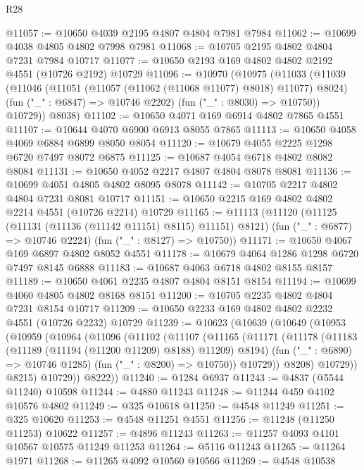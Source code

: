 \begin{lexlean}{R28}
\begin{coremodule}
@11057 := @10650 @4039 @2195 @4807 @4804 @7981 @7984
@11062 := @10699 @4038 @4805 @4802 @7998 @7981
@11068 := @10705 @2195 @4802 @4804 @7231 @7984 @10717
@11077 := @10650 @2193 @169 @4802 @4802 @2192 @4551 (@10726 @2192) @10729
@11096 := @10970
    (@10975
      (@11033
        (@11039
          (@11046
            (@11051 (@11057 (@11062 (@11068 @11077) @8018) @11077) @8024)
            (fun ("_" : @6847) => @10746 @2202)
            (fun ("_" : @8030) => @10750))
          @10729))
      @8038)
@11102 := @10650 @4071 @169 @6914 @4802 @7865 @4551
@11107 := @10644 @4070 @6900 @6913 @8055 @7865
@11113 := @10650 @4058 @4069 @6884 @6899 @8050 @8054
@11120 := @10679 @4055 @2225 @1298 @6720 @7497 @8072 @6875
@11125 := @10687 @4054 @6718 @4802 @8082 @8084
@11131 := @10650 @4052 @2217 @4807 @4804 @8078 @8081
@11136 := @10699 @4051 @4805 @4802 @8095 @8078
@11142 := @10705 @2217 @4802 @4804 @7231 @8081 @10717
@11151 := @10650 @2215 @169 @4802 @4802 @2214 @4551 (@10726 @2214) @10729
@11165 := @11113
    (@11120
      (@11125 (@11131 (@11136 (@11142 @11151) @8115) @11151) @8121)
      (fun ("_" : @6877) => @10746 @2224)
      (fun ("_" : @8127) => @10750))
@11171 := @10650 @4067 @169 @6897 @4802 @8052 @4551
@11178 := @10679 @4064 @1286 @1298 @6720 @7497 @8145 @6888
@11183 := @10687 @4063 @6718 @4802 @8155 @8157
@11189 := @10650 @4061 @2235 @4807 @4804 @8151 @8154
@11194 := @10699 @4060 @4805 @4802 @8168 @8151
@11200 := @10705 @2235 @4802 @4804 @7231 @8154 @10717
@11209 := @10650 @2233 @169 @4802 @4802 @2232 @4551 (@10726 @2232) @10729
@11239 := @10623
    (@10639
      (@10649
        (@10953
          (@10959
            (@10964
              (@11096
                (@11102
                  (@11107
                    (@11165
                      (@11171
                        (@11178
                          (@11183 (@11189 (@11194 (@11200 @11209) @8188) @11209) @8194)
                          (fun ("_" : @6890) => @10746 @1285)
                          (fun ("_" : @8200) => @10750))
                        @10729))
                    @8208)
                  @10729))
              @8215)
            @10729))
        @8222))
@11240 := @1284 @6937
@11243 := @4837 (@5544 @11240) @10598
@11244 := @4880 @11243
@11248 := @11244 @459 @4102 @10576 @4802
@11249 := @325 @10618
@11250 := @4548 @11249
@11251 := @325 @10620
@11253 := @4548 @11251 @4551
@11256 := @11248 (@11250 @11253) @10622
@11257 := @4896 @11243
@11263 := @11257 @4093 @4101 @10567 @10575 @11249 @11253
@11264 := @5116 @11243
@11265 := @11264 @1971
@11268 := @11265 @4092 @10560 @10566
@11269 := @4548 @10538

\end{coremodule}
\end{lexlean}
